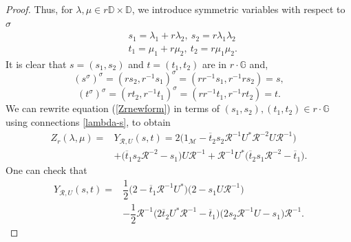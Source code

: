 \documentclass[12pt,reqno]{amsart}
\numberwithin{equation}{section}
\theoremstyle{definition}
\begin{document}
\begin{proof}
 Thus, for $\lambda, \mu \in r\mathbb{D}\times \mathbb{D}$, we introduce symmetric variables with respect to $\sigma$ 
\begin{align}\label{lambda-s}
& s_{1}=\lambda_{1}+r\lambda_{2},~s_{2} = r\lambda_{1}\lambda_{2} \nonumber\\
& t_{1}=\mu_{1}+r\mu_{2},~t_{2}=r\mu_{1}\mu_{2}. 
\end{align}
It is clear that  $s =(s_1, s_2)$ and $t=(t_1,t_2)$ are in $r \cdot \mathbb{G}$ and, 
\begin{equation}\label{sigmainvol-s1s2}
(s^{\sigma})^{\sigma} = (r s_{2},r^{-1} s_{1})^{\sigma} = (rr^{-1} s_{1},r^{-1} r s_{2}) = s,
\end{equation}
\begin{equation}\label{sigmainvol-t1t2}
(t^{\sigma})^{\sigma} = (r t_{2},r^{-1} t_{1})^{\sigma} = (rr^{-1} t_{1},r^{-1} r t_{2}) = t.
\end{equation}
We can rewrite equation (\ref{Zrnewform}) in terms of $(s_{1},s_{2}), (t_{1},t_{2}) \in r \cdot  \mathbb{G}$ using connections \eqref{lambda-s}, to obtain 
\begin{align}\label{Zr-YRU}
 Z_{r}(\lambda,\mu) = &  Y_{\mathcal{R},U}(s,t) = 2\Big(1_{\mathcal{M}}-\overline{t}_{2}s_{2}\mathcal{R}^{-1}U^{*}\mathcal{R}^{-2}U\mathcal{R}^{-1}\Big)\\
    &+\Big(\overline{t}_{1}s_{2}\mathcal{R}^{-2}-s_{1}\Big)U\mathcal{R}^{-1} 
+\mathcal{R}^{-1}U^{*}\Big(\overline{t}_{2}s_{1}\mathcal{R}^{-2}-\overline{t}_{1}\Big). \nonumber
\end{align}
One can check that
\begin{align*}
    Y_{\mathcal{R},U}(s,t) = &\dfrac{1}{2}\bigg(2-\overline{t}_{1}\mathcal{R}^{-1}U^{*}\bigg)\bigg(2-s_{1}U\mathcal{R}^{-1}\bigg)\\
    &-\dfrac{1}{2}\mathcal{R}^{-1}\bigg(2\overline{t}_{2}U^{*}\mathcal{R}^{-1}-\overline{t}_{1}\bigg)\bigg(2s_{2}\mathcal{R}^{-1}U-s_{1}\bigg)\mathcal{R}^{-1}.
\end{align*}


\end{proof}
\end{document}
